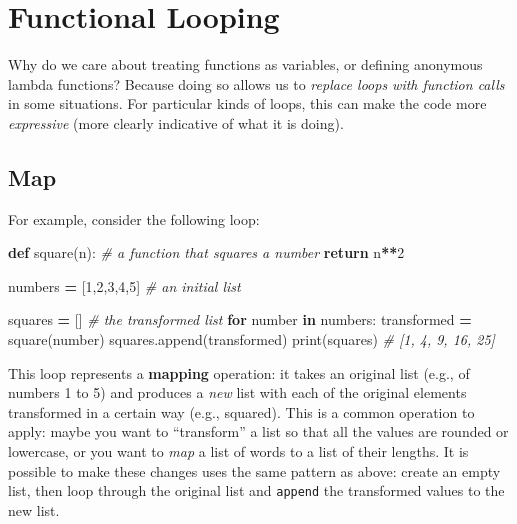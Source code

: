 \documentclass[]{book}
\newenvironment{Shaded}{\begin{snugshade}}{\end{snugshade}}
\newcommand{\KeywordTok}[1]{\textcolor[rgb]{0.13,0.29,0.53}{\textbf{#1}}}
\newcommand{\DecValTok}[1]{\textcolor[rgb]{0.00,0.00,0.81}{#1}}
\newcommand{\CommentTok}[1]{\textcolor[rgb]{0.56,0.35,0.01}{\textit{#1}}}
\newcommand{\ControlFlowTok}[1]{\textcolor[rgb]{0.13,0.29,0.53}{\textbf{#1}}}
\newcommand{\OperatorTok}[1]{\textcolor[rgb]{0.81,0.36,0.00}{\textbf{#1}}}
\newcommand{\BuiltInTok}[1]{#1}
\newcommand{\NormalTok}[1]{#1}
\begin{document}
\hypertarget{functional-looping}{\section{Functional
Looping}\label{functional-looping}}

Why do we care about treating functions as variables, or defining
anonymous lambda functions? Because doing so allows us to \emph{replace
loops with function calls} in some situations. For particular kinds of
loops, this can make the code more \emph{expressive} (more clearly
indicative of what it is doing).

\hypertarget{map}{\subsection{Map}\label{map}}

For example, consider the following loop:

\begin{Shaded}
\begin{Highlighting}[]
\KeywordTok{def}\NormalTok{ square(n): }\CommentTok{# a function that squares a number}
    \ControlFlowTok{return}\NormalTok{ n}\OperatorTok{**}\DecValTok{2}

\NormalTok{numbers }\OperatorTok{=}\NormalTok{ [}\DecValTok{1}\NormalTok{,}\DecValTok{2}\NormalTok{,}\DecValTok{3}\NormalTok{,}\DecValTok{4}\NormalTok{,}\DecValTok{5}\NormalTok{]  }\CommentTok{# an initial list}

\NormalTok{squares }\OperatorTok{=}\NormalTok{ []  }\CommentTok{# the transformed list}
\ControlFlowTok{for}\NormalTok{ number }\KeywordTok{in}\NormalTok{ numbers:}
\NormalTok{    transformed }\OperatorTok{=}\NormalTok{ square(number)}
\NormalTok{    squares.append(transformed)}
\BuiltInTok{print}\NormalTok{(squares)  }\CommentTok{# [1, 4, 9, 16, 25]}
\end{Highlighting}
\end{Shaded}

This loop represents a \textbf{mapping} operation: it takes an original
list (e.g., of numbers 1 to 5) and produces a \emph{new} list with each
of the original elements transformed in a certain way (e.g., squared).
This is a common operation to apply: maybe you want to ``transform'' a
list so that all the values are rounded or lowercase, or you want to
\emph{map} a list of words to a list of their lengths. It is possible to
make these changes uses the same pattern as above: create an empty list,
then loop through the original list and \texttt{append} the transformed
values to the new list.
\end{document}
